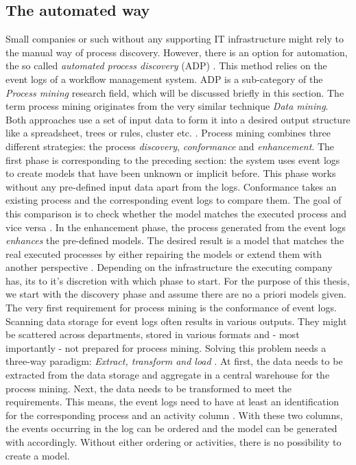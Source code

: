 \subsection{The automated way}
Small companies or such without any supporting IT infrastructure might rely to the manual way of process discovery. However, there is an option for automation, the so called \textit{automated process discovery} (ADP) \cite{Dumas2013}. This method relies on the event logs of a workflow management system. ADP is a sub-category of the \textit{Process mining} research field, which will be discussed briefly in this section.
The term process mining originates from the very similar technique \textit{Data mining}. Both approaches use a set of input data to form it into a desired output structure like a spreadsheet, trees or rules, cluster etc. \cite{Aalst2011}. Process mining combines three different strategies: the process \textit{discovery}, \textit{conformance} and \textit{enhancement}. The first phase is corresponding to the preceding section: the system uses event logs to create models that have been unknown or implicit before. This phase works without any pre-defined input data apart from the logs. Conformance takes an existing process and the corresponding event logs to compare them. The goal of this comparison is to check whether the model matches the executed process and vice versa \cite{Aalst2011}. 
In the enhancement phase, the process generated from the event logs \textit{enhances} the pre-defined models. The desired result is a model that matches the real executed processes by either repairing the models or extend them with another perspective \cite{Aalst2011}. 
Depending on the infrastructure the executing company has, its to it's discretion with which phase to start. For the purpose of this thesis, we start with the discovery phase and assume there are no a priori models given. 
The very first requirement for process mining is the conformance of event logs. Scanning data storage for event logs often results in various outputs. They might be scattered across departments, stored in various formats and - most importantly - not prepared for process mining. Solving this problem needs a three-way paradigm: \textit{Extract, transform and load} \cite{Aalst2011}. At first, the data needs to be extracted from the data storage and aggregate in a central warehouse for the process mining. Next, the data needs to be transformed to meet the requirements. This means, the event logs need to have at least an identification for the corresponding process and an activity column \cite{Aalst2011}. With these two columns, the events occurring in the log can be ordered and the model can be generated with accordingly. Without either ordering or activities, there is no possibility to create a model. 
